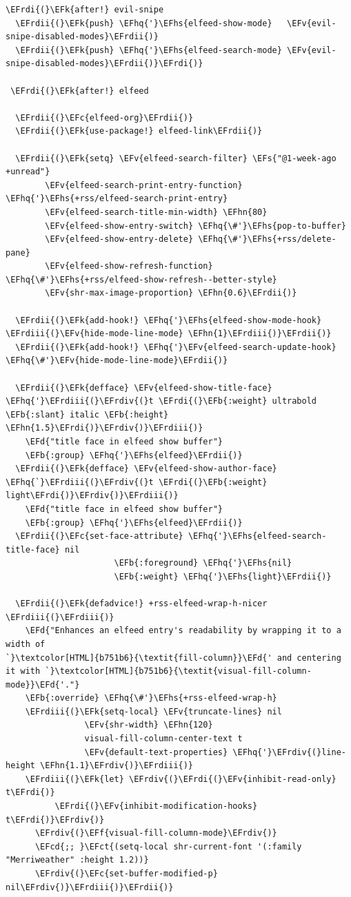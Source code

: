 \documentclass{scrartcl}
\newcommand{\EFk}[1]{\textcolor{EFk}{#1}} %
\newcommand{\EFd}[1]{\textcolor{EFd}{\textit{#1}}} %
\newcommand{\EFs}[1]{\textcolor{EFs}{#1}} %
\newcommand{\EFb}[1]{\textcolor{EFb}{#1}} %
\newcommand{\EFct}[1]{\textcolor{EFct}{#1}} %
\newcommand{\EFc}[1]{\textcolor{EFc}{#1}} %
\newcommand{\EFv}[1]{\textcolor{EFv}{#1}} %
\newcommand{\EFf}[1]{\textcolor{EFf}{#1}} %
\newcommand{\EFcd}[1]{\textcolor{EFcd}{#1}} %
\newcommand{\EFhn}[1]{\textcolor{EFhn}{\textbf{#1}}} %
\newcommand{\EFhq}[1]{\textcolor{EFhq}{#1}} %
\newcommand{\EFhs}[1]{\textcolor{EFhs}{#1}} %
\newcommand{\EFrdi}[1]{\textcolor{EFrdi}{#1}} %
\newcommand{\EFrdii}[1]{\textcolor{EFrdii}{#1}} %
\newcommand{\EFrdiii}[1]{\textcolor{EFrdiii}{#1}} %
\newcommand{\EFrdiv}[1]{\textcolor{EFrdiv}{#1}} %
\begin{document}
\begin{Code}
\begin{Verbatim}[]
\EFrdi{(}\EFk{after!} evil-snipe
  \EFrdii{(}\EFk{push} \EFhq{'}\EFhs{elfeed-show-mode}   \EFv{evil-snipe-disabled-modes}\EFrdii{)}
  \EFrdii{(}\EFk{push} \EFhq{'}\EFhs{elfeed-search-mode} \EFv{evil-snipe-disabled-modes}\EFrdii{)}\EFrdi{)}

 \EFrdi{(}\EFk{after!} elfeed

  \EFrdii{(}\EFc{elfeed-org}\EFrdii{)}
  \EFrdii{(}\EFk{use-package!} elfeed-link\EFrdii{)}

  \EFrdii{(}\EFk{setq} \EFv{elfeed-search-filter} \EFs{"@1-week-ago +unread"}
        \EFv{elfeed-search-print-entry-function} \EFhq{'}\EFhs{+rss/elfeed-search-print-entry}
        \EFv{elfeed-search-title-min-width} \EFhn{80}
        \EFv{elfeed-show-entry-switch} \EFhq{\#'}\EFhs{pop-to-buffer}
        \EFv{elfeed-show-entry-delete} \EFhq{\#'}\EFhs{+rss/delete-pane}
        \EFv{elfeed-show-refresh-function} \EFhq{\#'}\EFhs{+rss/elfeed-show-refresh--better-style}
        \EFv{shr-max-image-proportion} \EFhn{0.6}\EFrdii{)}

  \EFrdii{(}\EFk{add-hook!} \EFhq{'}\EFhs{elfeed-show-mode-hook} \EFrdiii{(}\EFv{hide-mode-line-mode} \EFhn{1}\EFrdiii{)}\EFrdii{)}
  \EFrdii{(}\EFk{add-hook!} \EFhq{'}\EFv{elfeed-search-update-hook} \EFhq{\#'}\EFv{hide-mode-line-mode}\EFrdii{)}

  \EFrdii{(}\EFk{defface} \EFv{elfeed-show-title-face} \EFhq{'}\EFrdiii{(}\EFrdiv{(}t \EFrdi{(}\EFb{:weight} ultrabold \EFb{:slant} italic \EFb{:height} \EFhn{1.5}\EFrdi{)}\EFrdiv{)}\EFrdiii{)}
    \EFd{"title face in elfeed show buffer"}
    \EFb{:group} \EFhq{'}\EFhs{elfeed}\EFrdii{)}
  \EFrdii{(}\EFk{defface} \EFv{elfeed-show-author-face} \EFhq{`}\EFrdiii{(}\EFrdiv{(}t \EFrdi{(}\EFb{:weight} light\EFrdi{)}\EFrdiv{)}\EFrdiii{)}
    \EFd{"title face in elfeed show buffer"}
    \EFb{:group} \EFhq{'}\EFhs{elfeed}\EFrdii{)}
  \EFrdii{(}\EFc{set-face-attribute} \EFhq{'}\EFhs{elfeed-search-title-face} nil
                      \EFb{:foreground} \EFhq{'}\EFhs{nil}
                      \EFb{:weight} \EFhq{'}\EFhs{light}\EFrdii{)}

  \EFrdii{(}\EFk{defadvice!} +rss-elfeed-wrap-h-nicer \EFrdiii{(}\EFrdiii{)}
    \EFd{"Enhances an elfeed entry's readability by wrapping it to a width of
`}\textcolor[HTML]{b751b6}{\textit{fill-column}}\EFd{' and centering it with `}\textcolor[HTML]{b751b6}{\textit{visual-fill-column-mode}}\EFd{'."}
    \EFb{:override} \EFhq{\#'}\EFhs{+rss-elfeed-wrap-h}
    \EFrdiii{(}\EFk{setq-local} \EFv{truncate-lines} nil
                \EFv{shr-width} \EFhn{120}
                visual-fill-column-center-text t
                \EFv{default-text-properties} \EFhq{'}\EFrdiv{(}line-height \EFhn{1.1}\EFrdiv{)}\EFrdiii{)}
    \EFrdiii{(}\EFk{let} \EFrdiv{(}\EFrdi{(}\EFv{inhibit-read-only} t\EFrdi{)}
          \EFrdi{(}\EFv{inhibit-modification-hooks} t\EFrdi{)}\EFrdiv{)}
      \EFrdiv{(}\EFf{visual-fill-column-mode}\EFrdiv{)}
      \EFcd{;; }\EFct{(setq-local shr-current-font '(:family "Merriweather" :height 1.2))}
      \EFrdiv{(}\EFc{set-buffer-modified-p} nil\EFrdiv{)}\EFrdiii{)}\EFrdii{)}


\end{Verbatim}
\end{Code}
\end{document}
